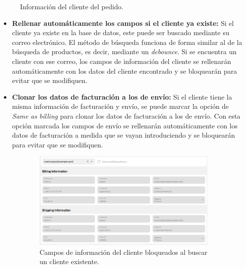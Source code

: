 \begin{enumerate}
\begin{figure}[H]
              \caption{Información del cliente del pedido.}
              \label{fig:dev:ss:creacion_pedido_2}
          \end{figure}
          \begin{itemize}
              \item \textbf{Rellenar automáticamente los campos si el cliente ya existe:} Si el cliente ya existe en la base de datos, este puede ser buscado mediante su correo electrónico. El método de búsqueda funciona de forma similar al de la búsqueda de productos, es decir, mediante un \textit{debounce}. Si se encuentra un cliente con ese correo, los campos de información del cliente se rellenarán automáticamente con los datos del cliente encontrado y se bloquearán para evitar que se modifiquen.
              \item \textbf{Clonar los datos de facturación a los de envío:} Si el cliente tiene la misma información de facturación y envío, se puede marcar la opción de \textit{Same as billing} para clonar los datos de facturación a los de envío. Con esta opción marcada los campos de envío se rellenarán automáticamente con los datos de facturación a medida que se vayan introduciendo y se bloquearán para evitar que se modifiquen.
          \end{itemize}
          \begin{figure}[H]
              \centering
              \begin{subfigure}{0.45\linewidth}
                  \centering
                  \includegraphics[width=\linewidth]{figures/design_develop/screenshots/creacion_pedido_2_bloqueado_search.png}
                  \caption{Campos de información del cliente bloqueados al buscar un cliente existente.}
              \end{subfigure}
              \hfill
              \begin{subfigure}{0.45\linewidth}

\end{subfigure}
\end{figure}
\end{enumerate}
